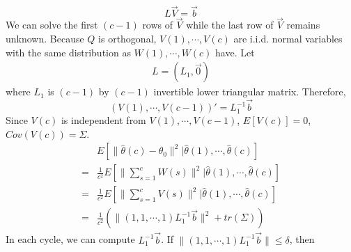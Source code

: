 \documentclass{article}
\theoremstyle{plain}
\theoremstyle{definition}
\begin{document}
\[L\vec{V}=\vec{b}\]
We can solve the first $(c-1)$ rows of $\vec{V}$ while the last row of $\vec{V}$ remains unknown. Because $Q$ is orthogonal, $V(1),\cdots, V(c)$ are i.i.d. normal variables with the same distribution as $W(1),\cdots,W(c)$ have. Let
\begin{align*}
L=\left(L_1,\vec{0}\right)
\end{align*}
where $L_1$ is $(c-1)$ by $(c-1)$ invertible lower triangular matrix. Therefore,
\[(V(1),\cdots,V(c-1))' = L_1^{-1}\vec{b}\]
Since $V(c)$ is independent from $V(1),\cdots,V(c-1)$, $E[V(c)]=0$, $Cov(V(c))=\Sigma$.
\begin{align*}
& E[\|\hat{\theta}(c)-\theta_0\|^2|\hat{\theta}(1),\cdots,\hat{\theta}(c)]\\
= & \frac{1}{c^2}E[\|\sum_{s=1}^{c} W(s)\|^2|\hat{\theta}(1),\cdots,\hat{\theta}(c)]\\
= & \frac{1}{c^2}E[\|\sum_{s=1}^{c} V(s)\|^2|\hat{\theta}(1),\cdots,\hat{\theta}(c)]\\
= & \frac{1}{c^2}\left(\|(1,1,\cdots,1)L_1^{-1}\vec{b}\|^2+tr(\Sigma)\right)
\end{align*}
In each cycle, we can compute $L_1^{-1}\vec{b}$. If $\|(1,1,\cdots,1)L_1^{-1}\vec{b}\|\leq\delta$, then  
\end{document}
